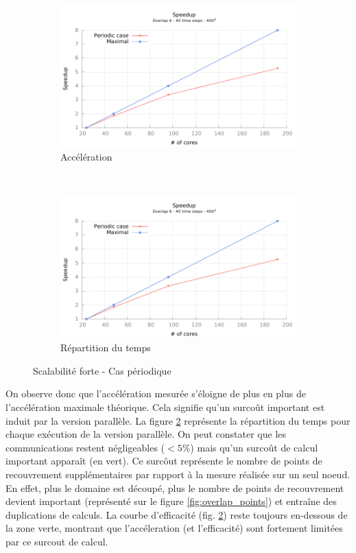 \begin{figure}[!ht]
  \centering
  \begin{subfigure}[b]{0.5\textwidth}
    \centering
    \includegraphics[scale=0.7]{gnuplot/bench_strong_nemo.pdf}
    \caption{\label{fig:strong_per} Accélération}
  \end{subfigure}%
  ~
  \begin{subfigure}[b]{0.5\textwidth}
    \centering
    \includegraphics[scale=0.7,page=3]{gnuplot/bench_strong_nemo.pdf}
    \caption{\label{fig:strong_per_time} Répartition du temps}
  \end{subfigure}
  \caption{\label{fig:bench_strong_per}Scalabilité forte - Cas périodique}
\end{figure}


On observe donc que l'accélération mesurée s'éloigne de plus en plus de l'accélération maximale théorique. Cela signifie qu'un surcoût important est induit par la version parallèle. La figure \ref{fig:strong_per_time} représente la répartition du temps pour chaque exécution de la version parallèle. On peut constater que les communications restent négligeables ($< 5\%$) mais qu'un surcoût de calcul important apparaît (en vert). Ce surcôut représente le nombre de points de recouvrement supplémentaires par rapport à la mesure réalisée sur un seul noeud. En effet, plus le domaine est découpé, plus le nombre de points de recouvrement devient important (représenté sur le figure \ref{fig:overlap_points}) et entraîne des duplications de calculs. La courbe d'efficacité (fig. \ref{fig:strong_per_time}) reste toujours en-dessous de la zone verte, montrant que l'accéleration (et l'efficacité) sont fortement limitées par ce surcout de calcul.


